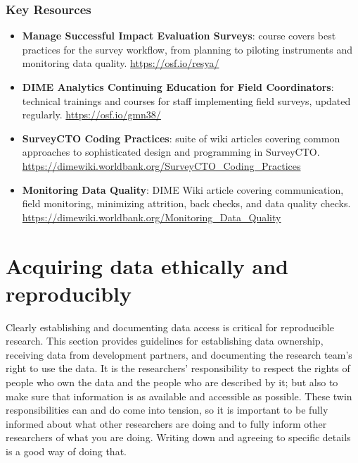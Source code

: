 \documentclass[
]{book}
\providecommand{\tightlist}{%
  \setlength{\itemsep}{0pt}\setlength{\parskip}{0pt}}
\begin{document}
\begin{summary}
\hypertarget{key-resources-3}{%
\subsubsection*{Key Resources}\label{key-resources-3}}

\begin{itemize}
\tightlist
\item
  \textbf{Manage Successful Impact Evaluation Surveys}: course covers best practices for the survey workflow, from planning to piloting instruments and monitoring data quality. \url{https://osf.io/resya/}
\item
  \textbf{DIME Analytics Continuing Education for Field Coordinators}: technical trainings and courses for staff implementing field surveys, updated regularly. \url{https://osf.io/gmn38/}
\item
  \textbf{SurveyCTO Coding Practices}: suite of wiki articles covering common approaches to sophisticated design and programming in SurveyCTO. \url{https://dimewiki.worldbank.org/SurveyCTO_Coding_Practices}
\item
  \textbf{Monitoring Data Quality}: DIME Wiki article covering communication, field monitoring, minimizing attrition, back checks, and data quality checks. \url{https://dimewiki.worldbank.org/Monitoring_Data_Quality}
\end{itemize}
\end{summary}

\hypertarget{acquiring-data-ethically-and-reproducibly}{%
\section*{Acquiring data ethically and reproducibly}\label{acquiring-data-ethically-and-reproducibly}}

Clearly establishing and documenting data access is critical for reproducible research.
This section provides guidelines for
establishing data ownership, receiving data from development partners,
and documenting the research team's right to use the data.
It is the researchers' responsibility to respect the rights
of people who own the data and the people who are described by it;
but also to make sure that information is as available and accessible as possible.
These twin responsibilities can and do come into tension,
so it is important to be fully informed about what other researchers are doing
and to fully inform other researchers of what you are doing.
Writing down and agreeing to specific details is a good way of doing that.
\end{document}
